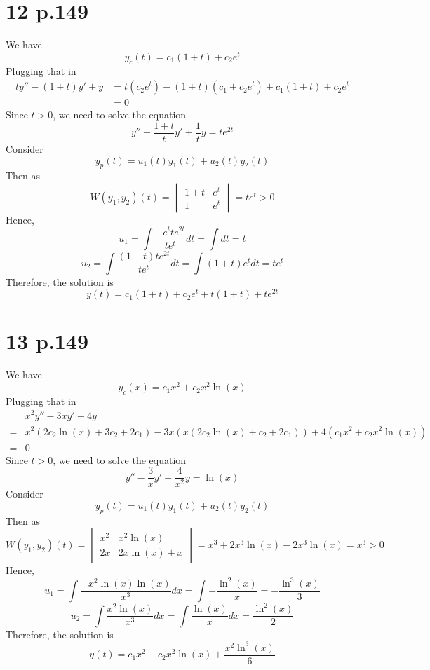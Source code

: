 \documentclass[11pt]{article}
\begin{document}
\section*{12 p.149}
We have 
\[
    y_c(t) = c_1(1+t) + c_2e^t    
\]
Plugging that in 
\begin{equation*}
    \begin{aligned}
        ty'' - (1+t)y' + y &= t(c_2e^t) -(1+t)(c_1 + c_2e^t) + c_1(1+t)+c_2e^t \\
        &= 0 
    \end{aligned}
\end{equation*}
Since $t>0$, we need to solve the equation 
\[
    y'' - \frac{1+t}{t}y' + \frac{1}{t}y = te^{2t}    
\]
Consider 
\[y_p(t) = u_1(t) y_1(t) + u_2(t)y_2(t)\]
Then as 
\[
    W(y_1,y_2)(t) = 
    \begin{vmatrix}
        1+t & e^t \\
        1 & e^t
    \end{vmatrix} = te^t > 0
\]
Hence, 
\[
    u_1 = \int \frac{-e^t te^{2t}}{te^t} dt = \int dt =  t
\]
\[
    u_2 = \int \frac{(1+t) te^{2t}}{te^t} dt = \int (1+t)e^t dt = te^t
\]
Therefore, the solution is 
\[
    y(t) =  c_1(1+t) + c_2e^t + t(1+t) + te^{2t}
\]
\newpage
\section*{13 p.149}
We have 
\[
    y_c(x) = c_1x^2 + c_2x^2\ln(x)   
\]
Plugging that in 
\begin{equation*}
    \begin{aligned}
        &x^2y'' -3xy' + 4y \\
        =& x^2(2c_2\ln\left(x\right)+3c_2+2c_1) - 3x(x\left(2c_2\ln\left(x\right)+c_2+2c_1\right)) + 4(c_1x^2 + c_2x^2\ln(x)) \\
        =& 0
    \end{aligned}
\end{equation*}
Since $t>0$, we need to solve the equation 
\[
    y'' - \frac{3}{x}y' + \frac{4}{x^2}y = \ln(x)   
\]
Consider 
\[y_p(t) = u_1(t) y_1(t) + u_2(t)y_2(t)\]
Then as 
\[
    W(y_1,y_2)(t) = 
    \begin{vmatrix}
        x^2 & x^2\ln(x) \\
        2x & 2x\ln(x) + x
    \end{vmatrix} = x^3 + 2x^3\ln(x) - 2x^3\ln(x) = x^3 >0
\]
Hence, 
\[
    u_1 = \int \frac{-x^2\ln(x) \ln(x)}{x^3} dx = \int -\frac{\ln^2(x)}{x}= -\frac{\ln^3(x)}{3}
\]
\[
    u_2 = \int \frac{x^2 \ln(x)}{x^3} dx = \int \frac{\ln(x)}{x} dx = \frac{\ln^2(x)}{2}
\]
Therefore, the solution is 
\[
    y(t) =  c_1x^2 + c_2x^2\ln(x) + \frac{x^2\ln^3(x)}{6} 
\]
\end{document}
